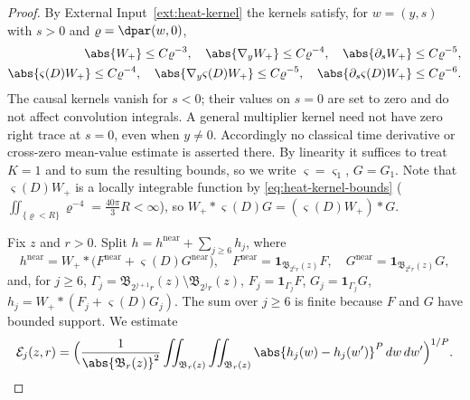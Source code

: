 \documentclass[11pt,reqno]{amsart}
\begin{document}
\begin{proof}
By External Input~\ref{ext:heat-kernel} the kernels satisfy, for
$w=(y,s)$ with $s>0$ and $\varrho=\dpar(w,0)$,
\begin{equation}\label{eq:heat-kernel-bounds}
 \begin{aligned}
  \abs{W_{+}}\le C\varrho^{-3},\quad
  \abs{\nabla_{y}W_{+}}\le C\varrho^{-4},\quad
  \abs{\partial_{s}W_{+}}\le C\varrho^{-5},\\
  \abs{\varsigma(D)W_{+}}\le C\varrho^{-4},\quad
  \abs{\nabla_{y}\varsigma(D)W_{+}}\le C\varrho^{-5},\quad
  \abs{\partial_{s}\varsigma(D)W_{+}}\le C\varrho^{-6}.
 \end{aligned}
\end{equation}
The causal kernels vanish for $s<0$; their values on $s=0$ are set to zero
and do not affect convolution integrals. A general multiplier kernel need
not have zero right trace at $s=0$, even when $y\ne0$. Accordingly no
classical time derivative or cross-zero mean-value estimate is asserted
there.
By linearity it suffices to treat $K=1$ and to sum the resulting bounds, so we
write $\varsigma=\varsigma_{1}$, $G=G_{1}$. Note that $\varsigma(D)W_{+}$ is a
locally integrable function by \eqref{eq:heat-kernel-bounds}
($\iint_{\{\varrho<R\}}\varrho^{-4}=\tfrac{40\pi}{3}R<\infty$), so
$W_{+}*\varsigma(D)G=(\varsigma(D)W_{+})*G$.

Fix $z$ and $r>0$. Split $h=h^{\mathrm{near}}+\sum_{j\ge6}h_{j}$, where
\[
  h^{\mathrm{near}}=W_{+}*\bigl(F^{\mathrm{near}}+\varsigma(D)G^{\mathrm{near}}\bigr),
  \quad
  F^{\mathrm{near}}=\mathbf{1}_{\mathfrak{B}_{2^{6}r}(z)}F,
  \quad
  G^{\mathrm{near}}=\mathbf{1}_{\mathfrak{B}_{2^{6}r}(z)}G,
\]
and, for $j\ge6$,
$\Gamma_{j}=\mathfrak{B}_{2^{j+1}r}(z)\setminus\mathfrak{B}_{2^{j}r}(z)$,
$F_{j}=\mathbf{1}_{\Gamma_{j}}F$, $G_{j}=\mathbf{1}_{\Gamma_{j}}G$,
$h_{j}=W_{+}*(F_{j}+\varsigma(D)G_{j})$. The sum over $j\ge6$ is finite because
$F$ and $G$ have bounded support. We estimate
\begin{equation}\label{eq:campanato-quantity}
  \mathcal{E}_{j}(z,r)
  =\Bigl(\frac{1}{\abs{\mathfrak{B}_{r}(z)}^{2}}
    \iint_{\mathfrak{B}_{r}(z)}\iint_{\mathfrak{B}_{r}(z)}
      \abs{h_{j}(w)-h_{j}(w')}^{P}\,dw\,dw'\Bigr)^{1/P}.
\end{equation}


\end{proof}
\end{document}
